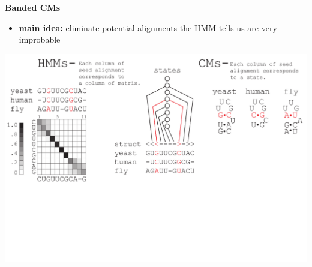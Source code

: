 \documentclass[landscape]{slides}
\begin{document}
\begin{slide}
\begin{center}
\large
\textbf{Banded CMs}
\end{center}
\medskip
\small
\begin{itemize}
\item
\textbf{main idea:} eliminate potential alignments the HMM tells us are very improbable
\end{itemize}
\begin{center}
\includegraphics[width=8in]{figs/post_hmm_to_cm_map2_layer9}
\end{center}
\vfill
\end{slide}
\end{document}
